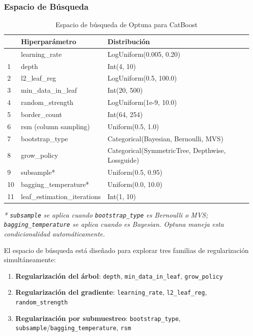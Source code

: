 \documentclass[
  spanish,
  11pt,
  letterpaper,
]{scrbook}
\providecommand{\tightlist}{%
  \setlength{\itemsep}{0pt}\setlength{\parskip}{0pt}}
\theoremstyle{plain}
\theoremstyle{remark}
\begin{document}
\subsubsection{Espacio de Búsqueda}\label{espacio-de-buxfasqueda}

{

\begin{longtable}[]{@{}lll@{}}

\caption{\label{tbl-search-space}Espacio de búsqueda de Optuna para
CatBoost}

\tabularnewline

\toprule\noalign{}
& Hiperparámetro & Distribución \\
\midrule\noalign{}
\endhead
\bottomrule\noalign{}
\endlastfoot
0 & learning\_rate & LogUniform(0.005, 0.20) \\
1 & depth & Int(4, 10) \\
2 & l2\_leaf\_reg & LogUniform(0.5, 100.0) \\
3 & min\_data\_in\_leaf & Int(20, 500) \\
4 & random\_strength & LogUniform(1e-9, 10.0) \\
5 & border\_count & Int(64, 254) \\
6 & rsm (column sampling) & Uniform(0.5, 1.0) \\
7 & bootstrap\_type & Categorical(Bayesian, Bernoulli, MVS) \\
8 & grow\_policy & Categorical(SymmetricTree, Depthwise, Lossguide) \\
9 & subsample* & Uniform(0.5, 0.95) \\
10 & bagging\_temperature* & Uniform(0.0, 10.0) \\
11 & leaf\_estimation\_iterations & Int(1, 10) \\

\end{longtable}

}

\emph{* \texttt{subsample} se aplica cuando \texttt{bootstrap\_type} es
Bernoulli o MVS; \texttt{bagging\_temperature} se aplica cuando es
Bayesian. Optuna maneja esta condicionalidad automáticamente.}

El espacio de búsqueda está diseñado para explorar tres familias de
regularización simultáneamente:

\begin{enumerate}
\def\labelenumi{\arabic{enumi}.}
\tightlist
\item
  \textbf{Regularización del árbol}: \texttt{depth},
  \texttt{min\_data\_in\_leaf}, \texttt{grow\_policy}
\item
  \textbf{Regularización del gradiente}: \texttt{learning\_rate},
  \texttt{l2\_leaf\_reg}, \texttt{random\_strength}
\item
  \textbf{Regularización por submuestreo}: \texttt{bootstrap\_type},
  \texttt{subsample}/\texttt{bagging\_temperature}, \texttt{rsm}
\end{enumerate}
\end{document}
